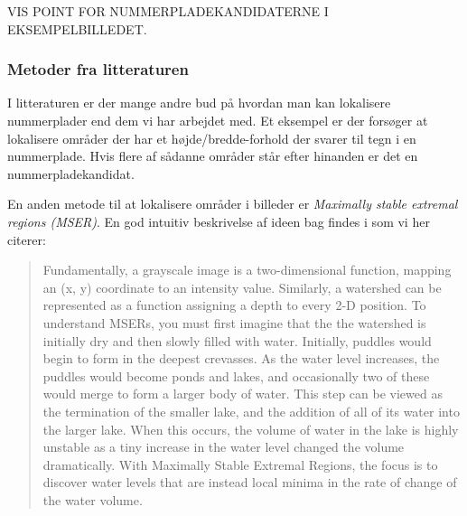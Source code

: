 VIS POINT FOR NUMMERPLADEKANDIDATERNE I EKSEMPELBILLEDET.

\subsubsection{Metoder fra litteraturen}
I litteraturen er der mange andre bud på hvordan man kan lokalisere nummerplader end dem vi har arbejdet med. Et eksempel er \cite{parker} der forsøger at lokalisere områder der har et højde/bredde-forhold der svarer til tegn i en nummerplade. Hvis flere af sådanne områder står efter hinanden er det en nummerpladekandidat.

En anden metode til at lokalisere områder i billeder er \textit{Maximally stable extremal regions (MSER)}. En god intuitiv beskrivelse af ideen bag findes i \cite{murphy} som vi her citerer:
\begin{quote}
Fundamentally, a grayscale image is a two-dimensional function, mapping an (x, y) coordinate to an intensity value. Similarly, a watershed can be represented as a function assigning a depth to every 2-D position. To understand MSERs, you must first imagine that the the watershed is initially dry and then slowly filled with water. Initially, puddles would begin to form in the deepest crevasses. As the water level increases, the puddles would become ponds and lakes, and occasionally two of these would merge to form a larger body of water. This step can be viewed as the termination of the smaller lake, and the addition of all of its water into the larger lake. When this occurs, the volume of water in the lake is highly unstable as a tiny increase in the water level changed the volume dramatically. With Maximally Stable Extremal Regions, the focus is to discover water levels that are instead local minima in the rate of change of the water volume.
\end{quote}



